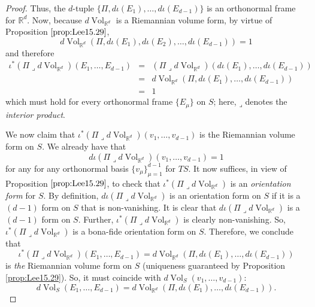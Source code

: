 \documentclass{article}
\theoremstyle{definition}
\renewcommand\det{\operatorname{det}}
\newcommand{\p}{\partial}
\newcommand{\R}{\mathbb{R}}
\newcommand{\f}[2]{\frac{#1}{#2}}
\newcommand{\lp}{\left(}
\newcommand{\rp}{\right)}
\newcommand{\iprod}{\mathbin{\lrcorner}}
\theoremstyle{theorem}
\newcommand{\Vol}{\operatorname{Vol}}
\begin{document}
\begin{proof}
%
Thus, the $d$-tuple $\{\Pi, d\iota(E_1),\dots, d\iota(E_{d-1})\}$ is an orthonormal frame for $\mathbb{R}^d$. Now, because $d\Vol_{\R^d}$ is a Riemannian volume form, by virtue of Proposition $\ref{prop:Lee15.29}$, 
\begin{equation*}
    d\Vol_{\R^d}(\Pi,d\iota(E_1),d\iota(E_2),\dots,d\iota(E_{d-1})) = 1
\end{equation*}
and therefore
\begin{eqnarray*}
     \iota^* (\Pi  \iprod d\Vol_{\R^d})(E_1,\dots, E_{d-1})&=& (\Pi  \iprod d\Vol_{\R^d})(d\iota(E_1),\dots, d\iota(E_{d-1})) \\
     &=& d\Vol_{\R^d}(\Pi, d\iota(E_1),\dots, d\iota(E_{d-1})) \\
    &=& 1
\end{eqnarray*}
which must hold for every orthonormal frame $\{E_\mu\}$ on $S$; here, $\iprod$ denotes the \textit{interior product}.

We now claim that $\iota^* (\Pi \iprod  d\Vol_{\R^d})(v_1,\dots, v_{d-1})$ is the Riemannian volume form on $S$. We already have that
\begin{equation*}
    d\iota (\Pi  \iprod d\Vol_{\R^d})(v_1,\dots, v_{d-1}) = 1
\end{equation*}
for any for any orthonormal basis $\{ v_{\mu} \}_{\mu=1}^{d-1}$ for $T S$. It now suffices, in view of Proposition $\ref{prop:Lee15.29}$, to check  that $\iota^* (\Pi  \iprod d\Vol_{\R^d})$ is an \textit{orientation form} for $S$. By definition, $d\iota (\Pi  \iprod d\Vol_{\R^d})$ is an orientation form on $S$ if it is a $(d-1)$ form on $S$ that is non-vanishing. It is clear that $d\iota (\Pi  \iprod d\Vol_{\R^d})$ is a $(d-1)$ form on $S$. Further, $\iota^* (\Pi  \iprod d\Vol_{\R^d})$ is clearly non-vanishing. So, $\iota^* (\Pi  \iprod d\Vol_{\R^d})$ is a bona-fide orientation form on $S$. Therefore, we conclude that 
\begin{equation*}
    \iota^* (\Pi  \iprod d\Vol_{\R^d})(E_1,\dots, E_{d-1}) = d\Vol_{\R^d}(\Pi, d\iota(E_1),\dots, d\iota(E_{d-1}))
\end{equation*}
is \textit{the} Riemannian volume form on $S$ (uniqueness guaranteed by Proposition \ref{prop:Lee15.29}). So, it must coincide with $d\Vol_S(v_1,\dots,v_{d-1})$:
\begin{equation*}
    d\Vol_S(E_1,\dots, E_{d-1}) = d\Vol_{\R^d}(\Pi, d\iota(E_1),\dots, d\iota(E_{d-1})).
\end{equation*}


\end{proof}
\end{document}
